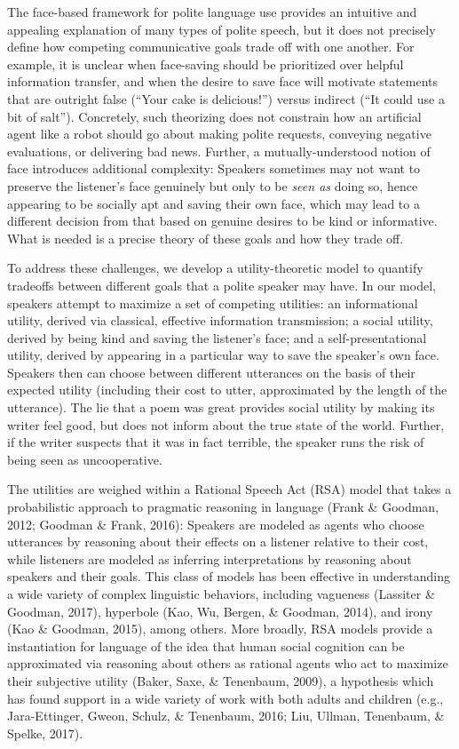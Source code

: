 \documentclass[floatsintext,man]{apa6}
\theoremstyle{definition}
\theoremstyle{definition}
\theoremstyle{definition}
\theoremstyle{remark}
\begin{document}
The face-based framework for polite language use provides an intuitive
and appealing explanation of many types of polite speech, but it does
not precisely define how competing communicative goals trade off with
one another. For example, it is unclear when face-saving should be
prioritized over helpful information transfer, and when the desire to
save face will motivate statements that are outright false
(\enquote{Your cake is delicious!}) versus indirect (\enquote{It could
use a bit of salt}). Concretely, such theorizing does not constrain how
an artificial agent like a robot should go about making polite requests,
conveying negative evaluations, or delivering bad news. Further, a
mutually-understood notion of face introduces additional complexity:
Speakers sometimes may not want to preserve the listener's face
genuinely but only to be \emph{seen as} doing so, hence appearing to be
socially apt and saving their own face, which may lead to a different
decision from that based on genuine desires to be kind or informative.
What is needed is a precise theory of these goals and how they trade
off.

To address these challenges, we develop a utility-theoretic model to
quantify tradeoffs between different goals that a polite speaker may
have. In our model, speakers attempt to maximize a set of competing
utilities: an informational utility, derived via classical, effective
information transmission; a social utility, derived by being kind and
saving the listener's face; and a self-presentational utility, derived
by appearing in a particular way to save the speaker's own face.
Speakers then can choose between different utterances on the basis of
their expected utility (including their cost to utter, approximated by
the length of the utterance). The lie that a poem was great provides
social utility by making its writer feel good, but does not inform about
the true state of the world. Further, if the writer suspects that it was
in fact terrible, the speaker runs the risk of being seen as
uncooperative.

The utilities are weighed within a Rational Speech Act (RSA) model that
takes a probabilistic approach to pragmatic reasoning in language (Frank
\& Goodman, 2012; Goodman \& Frank, 2016): Speakers are modeled as
agents who choose utterances by reasoning about their effects on a
listener relative to their cost, while listeners are modeled as
inferring interpretations by reasoning about speakers and their goals.
This class of models has been effective in understanding a wide variety
of complex linguistic behaviors, including vagueness (Lassiter \&
Goodman, 2017), hyperbole (Kao, Wu, Bergen, \& Goodman, 2014), and irony
(Kao \& Goodman, 2015), among others. More broadly, RSA models provide a
instantiation for language of the idea that human social cognition can
be approximated via reasoning about others as rational agents who act to
maximize their subjective utility (Baker, Saxe, \& Tenenbaum, 2009), a
hypothesis which has found support in a wide variety of work with both
adults and children (e.g., Jara-Ettinger, Gweon, Schulz, \& Tenenbaum,
2016; Liu, Ullman, Tenenbaum, \& Spelke, 2017).
\end{document}
